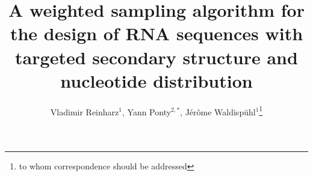 \documentclass{bioinfo}
\begin{document}

\title{A weighted sampling algorithm for the design of RNA sequences with targeted secondary structure and nucleotide distribution}
\author{Vladimir Reinharz$^1$, Yann Ponty$^{2,*}$, J\'er\^{o}me Waldisp\"{u}hl$^{1}$\footnote{to whom correspondence should be addressed}}
\address{$^1$ School of Computer Science, McGill University, Montreal, Canada\\ $^2$ Laboratoire d'informatique, \'Ecole Polytechnique, Palaiseau, France.}



\maketitle
\end{document}
